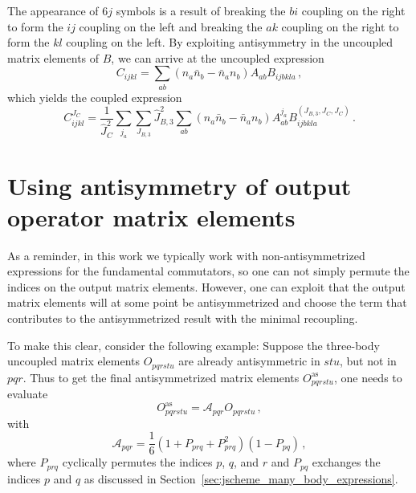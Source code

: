 The appearance of 6$j$ symbols is a result of
breaking the $bi$ coupling on the right to form the $ij$ coupling on the left
and breaking the $ak$ coupling on the right to form the $kl$ coupling on the left.
By exploiting antisymmetry in the uncoupled matrix elements of $B$,
we can arrive at the uncoupled expression
\begin{equation}
    C_{ijkl} = \sum_{ab} (n_a \bar{n}_b - \bar{n}_a n_b) A_{ab} B_{ijbkla}\,,
\end{equation}
which yields the coupled expression
\begin{equation}
    C_{ijkl}^{J_C} = \frac{1}{\hat{J}_{C}^2}
    \sum_{j_a}
    \sum_{J_{B,3}} \hat{J}_{B,3}^2
    \sum_{ab} (n_a \bar{n}_b - \bar{n}_a n_b)
    A_{ab}^{j_a} B_{ijbkla}^{(J_{B,3}, J_{C}, J_{C})}\,.
\end{equation}

\section{Using antisymmetry of output operator matrix elements}

As a reminder, in this work we typically work with
non-antisymmetrized expressions for the fundamental commutators,
so one can not simply permute the indices on the output matrix elements.
However, one can exploit that the output matrix elements
will at some point be antisymmetrized
and choose the term that contributes to the antisymmetrized result
with the minimal recoupling.

To make this clear, consider the following example:
Suppose the three-body uncoupled matrix elements $O_{pqrstu}$
are already antisymmetric in $stu$, but not in $pqr$.
Thus to get the final antisymmetrized matrix elements $O^{\text{as}}_{pqrstu}$,
one needs to evaluate
\begin{equation}\label{eq:antisymmetrize_short}
    O^{\text{as}}_{pqrstu} = \mathcal{A}_{pqr} O_{pqrstu}\,,
\end{equation}
with
\begin{equation}
    \mathcal{A}_{pqr} = \frac{1}{6} (1 + P_{prq} + P_{prq}^2) (1 - P_{pq})\,,
\end{equation}
where $P_{prq}$ cyclically permutes the indices $p$, $q$, and $r$
and $P_{pq}$ exchanges the indices $p$ and $q$
as discussed in Section~\ref{sec:jscheme_many_body_expressions}.

